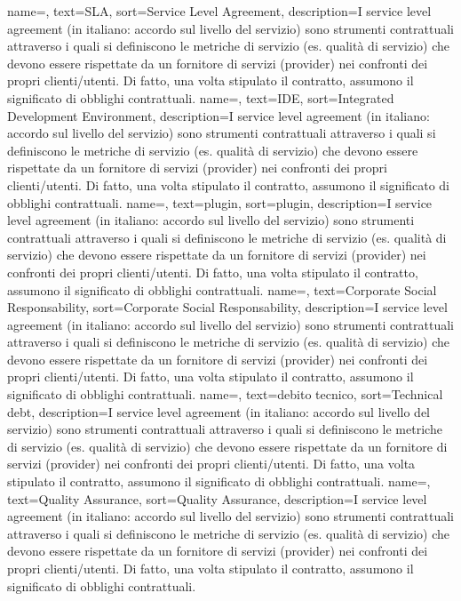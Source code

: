 {
	name=,
	text=SLA,
	sort=Service Level Agreement,
	description={I service level agreement (in italiano: accordo sul livello del servizio) sono strumenti contrattuali attraverso i quali si definiscono le metriche di servizio (es. qualità di servizio) che devono essere rispettate da un fornitore di servizi (provider) nei confronti dei propri clienti/utenti. Di fatto, una volta stipulato il contratto, assumono il significato di obblighi contrattuali.}
}
{
	name=,
	text=IDE,
	sort=Integrated Development Environment,
	description={I service level agreement (in italiano: accordo sul livello del servizio) sono strumenti contrattuali attraverso i quali si definiscono le metriche di servizio (es. qualità di servizio) che devono essere rispettate da un fornitore di servizi (provider) nei confronti dei propri clienti/utenti. Di fatto, una volta stipulato il contratto, assumono il significato di obblighi contrattuali.}
}
{
	name=,
	text=plugin,
	sort=plugin,
	description={I service level agreement (in italiano: accordo sul livello del servizio) sono strumenti contrattuali attraverso i quali si definiscono le metriche di servizio (es. qualità di servizio) che devono essere rispettate da un fornitore di servizi (provider) nei confronti dei propri clienti/utenti. Di fatto, una volta stipulato il contratto, assumono il significato di obblighi contrattuali.}
}
{
	name=,
	text=Corporate Social Responsability,
	sort=Corporate Social Responsability,
	description={I service level agreement (in italiano: accordo sul livello del servizio) sono strumenti contrattuali attraverso i quali si definiscono le metriche di servizio (es. qualità di servizio) che devono essere rispettate da un fornitore di servizi (provider) nei confronti dei propri clienti/utenti. Di fatto, una volta stipulato il contratto, assumono il significato di obblighi contrattuali.}
}
{
	name=,
	text=debito tecnico,
	sort=Technical debt,
	description={I service level agreement (in italiano: accordo sul livello del servizio) sono strumenti contrattuali attraverso i quali si definiscono le metriche di servizio (es. qualità di servizio) che devono essere rispettate da un fornitore di servizi (provider) nei confronti dei propri clienti/utenti. Di fatto, una volta stipulato il contratto, assumono il significato di obblighi contrattuali.}
}
{
	name=,
	text=Quality Assurance,
	sort=Quality Assurance,
	description={I service level agreement (in italiano: accordo sul livello del servizio) sono strumenti contrattuali attraverso i quali si definiscono le metriche di servizio (es. qualità di servizio) che devono essere rispettate da un fornitore di servizi (provider) nei confronti dei propri clienti/utenti. Di fatto, una volta stipulato il contratto, assumono il significato di obblighi contrattuali.}
}
